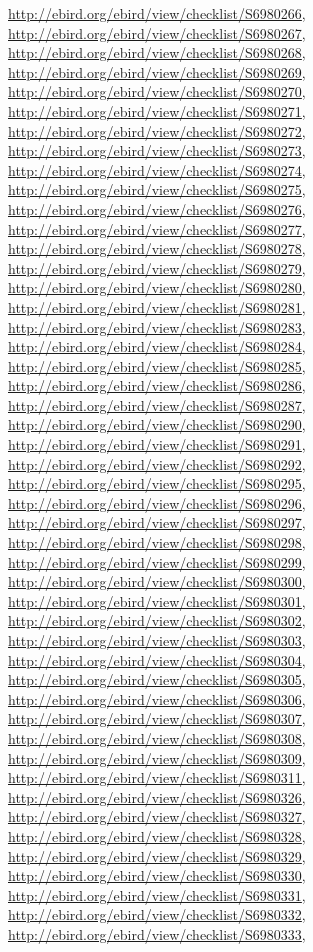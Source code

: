 \documentclass[9pt, article]{memoir}
\begin{document}
\begin{multicols}{2}
\url{http://ebird.org/ebird/view/checklist/S6980266}, 
\url{http://ebird.org/ebird/view/checklist/S6980267}, 
\url{http://ebird.org/ebird/view/checklist/S6980268}, 
\url{http://ebird.org/ebird/view/checklist/S6980269}, 
\url{http://ebird.org/ebird/view/checklist/S6980270}, 
\url{http://ebird.org/ebird/view/checklist/S6980271}, 
\url{http://ebird.org/ebird/view/checklist/S6980272}, 
\url{http://ebird.org/ebird/view/checklist/S6980273}, 
\url{http://ebird.org/ebird/view/checklist/S6980274}, 
\url{http://ebird.org/ebird/view/checklist/S6980275}, 
\url{http://ebird.org/ebird/view/checklist/S6980276}, 
\url{http://ebird.org/ebird/view/checklist/S6980277}, 
\url{http://ebird.org/ebird/view/checklist/S6980278}, 
\url{http://ebird.org/ebird/view/checklist/S6980279}, 
\url{http://ebird.org/ebird/view/checklist/S6980280}, 
\url{http://ebird.org/ebird/view/checklist/S6980281}, 
\url{http://ebird.org/ebird/view/checklist/S6980283}, 
\url{http://ebird.org/ebird/view/checklist/S6980284}, 
\url{http://ebird.org/ebird/view/checklist/S6980285}, 
\url{http://ebird.org/ebird/view/checklist/S6980286}, 
\url{http://ebird.org/ebird/view/checklist/S6980287}, 
\url{http://ebird.org/ebird/view/checklist/S6980290}, 
\url{http://ebird.org/ebird/view/checklist/S6980291}, 
\url{http://ebird.org/ebird/view/checklist/S6980292}, 
\url{http://ebird.org/ebird/view/checklist/S6980295}, 
\url{http://ebird.org/ebird/view/checklist/S6980296}, 
\url{http://ebird.org/ebird/view/checklist/S6980297}, 
\url{http://ebird.org/ebird/view/checklist/S6980298}, 
\url{http://ebird.org/ebird/view/checklist/S6980299}, 
\url{http://ebird.org/ebird/view/checklist/S6980300}, 
\url{http://ebird.org/ebird/view/checklist/S6980301}, 
\url{http://ebird.org/ebird/view/checklist/S6980302}, 
\url{http://ebird.org/ebird/view/checklist/S6980303}, 
\url{http://ebird.org/ebird/view/checklist/S6980304}, 
\url{http://ebird.org/ebird/view/checklist/S6980305}, 
\url{http://ebird.org/ebird/view/checklist/S6980306}, 
\url{http://ebird.org/ebird/view/checklist/S6980307}, 
\url{http://ebird.org/ebird/view/checklist/S6980308}, 
\url{http://ebird.org/ebird/view/checklist/S6980309}, 
\url{http://ebird.org/ebird/view/checklist/S6980311}, 
\url{http://ebird.org/ebird/view/checklist/S6980326}, 
\url{http://ebird.org/ebird/view/checklist/S6980327}, 
\url{http://ebird.org/ebird/view/checklist/S6980328}, 
\url{http://ebird.org/ebird/view/checklist/S6980329}, 
\url{http://ebird.org/ebird/view/checklist/S6980330}, 
\url{http://ebird.org/ebird/view/checklist/S6980331}, 
\url{http://ebird.org/ebird/view/checklist/S6980332}, 
\url{http://ebird.org/ebird/view/checklist/S6980333}, 

\end{multicols}
\end{document}
